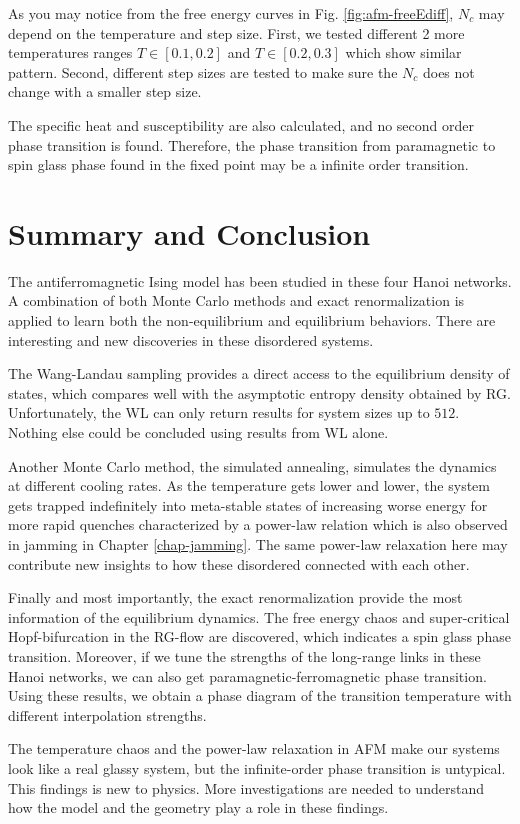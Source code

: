 As you may notice from the free energy curves in Fig. \ref{fig:afm-freeEdiff}, $N_c$ may depend on the temperature and step size. First, we tested different 2 more temperatures ranges $T \in [0.1, 0.2]$ and $T \in [0.2, 0.3]$ which show similar pattern. Second, different step sizes are tested to make sure the $N_c$ does not change with a smaller step size. 

The specific heat and susceptibility are also calculated, and no second order phase transition is found. Therefore, the phase transition from paramagnetic to spin glass phase found in the fixed point may be a infinite order transition. 


\section{Summary and Conclusion}
The antiferromagnetic Ising model has been studied in these four Hanoi networks. A combination of both Monte Carlo methods and exact renormalization is applied to learn both the non-equilibrium and equilibrium behaviors. There are interesting and new discoveries in these disordered systems.

The Wang-Landau sampling provides a direct access to the equilibrium density of states, which compares well with the asymptotic entropy density obtained by RG. Unfortunately, the WL can only return results for system sizes up to $512$. Nothing else could be concluded using results from WL alone. 

Another Monte Carlo method, the simulated annealing, simulates the dynamics at different cooling rates. As the temperature gets lower and lower, the system gets trapped indefinitely into meta-stable states of increasing worse energy for more rapid quenches characterized by a power-law relation \cite{cheng2015jamming} which is also observed in jamming in Chapter \ref{chap-jamming}. The same power-law relaxation here may contribute new insights to how these disordered connected with each other.

Finally and most importantly, the exact renormalization provide the most information of the equilibrium dynamics. The free energy chaos and super-critical Hopf-bifurcation in the RG-flow are discovered, which indicates a spin glass phase transition. Moreover, if we tune the strengths of the long-range links in these Hanoi networks, we can also get paramagnetic-ferromagnetic phase transition. Using these results, we obtain a phase diagram of the transition temperature with different interpolation strengths.

The temperature chaos and the power-law relaxation in AFM make our systems look like a real glassy system, but the infinite-order phase transition is untypical. This findings is new to physics. More investigations are needed to understand how the model and the geometry play a role in these findings. 









